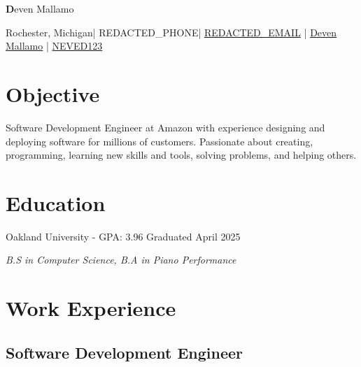 \documentclass{article}
\newcommand{\resumesection}[1]{
	\section*{\Large\textbf{#1}}
	\hrulefill
	\vspace{1ex}
}
\newcommand{\name}{Deven Mallamo}
\newcommand{\address}{Rochester, \hspace{49152sp}Michigan}
\newcommand{\phone}{REDACTED_PHONE}
\newcommand{\email}{REDACTED_EMAIL}
\newcommand{\linkedin}{Deven Mallamo}
\newcommand{\github}{NEVED123}
\begin{document}
\begin{tcolorbox}[colback= boxfill,colframe=boxframe]
	\begin{center}
		\vspace{5pt}
		\Huge \textbf \name

		\normalsize \vspace{10pt}

		\faHome \space \address \space | 
		\space \faPhone \space \phone \space \space |
		\space \href{mailto:\email}{\faEnvelope \space \email} \space | 
		\href{https://www.linkedin.com/in/deven-mallamo/}{\space \faLinkedin \space \linkedin} \space | 
		\href{https://github.com/NEVED123}{\space \faGithub \space \github} 
	\end{center}
\end{tcolorbox}

\vspace{1ex}

\resumesection{Objective}

\vspace{.2ex}	

Software Development Engineer at Amazon with experience designing and deploying software for millions of customers. Passionate about creating, programming, learning new skills and tools, solving problems, and helping others.

\vspace{.5ex}	


\resumesection{Education}

\vspace{.2ex}	

Oakland University - GPA: 3.96 \hfill Graduated April 2025

\textit {B.S in Computer Science, B.\hspace{49152sp}A in Piano Performance} 

\vspace{.5ex}


\resumesection{Work Experience}

\subsection*{Software Development Engineer} 
\end{document}
